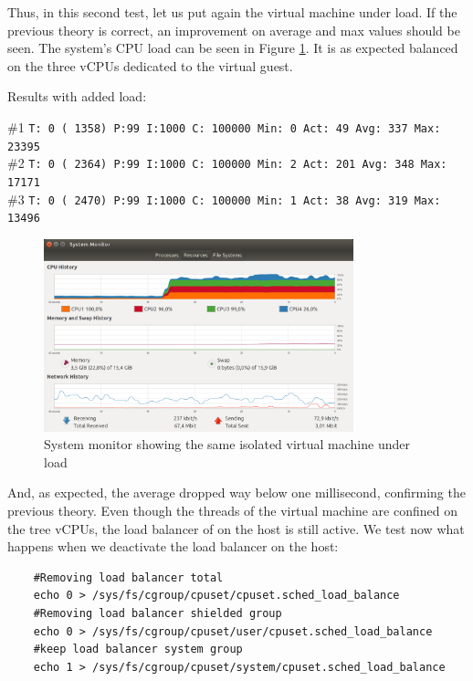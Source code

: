 \documentclass[]{scrartcl}
\begin{document}
Thus, in this second test, let us put again the virtual machine under load. If the previous theory is correct, an improvement on average and max values should be seen. The system's CPU load can be seen in Figure \ref{fig:test-cpuload}. It is as expected balanced on the three vCPUs dedicated to the virtual guest.

\noindent Results with added load: 

\noindent \small \#1 \texttt{T: 0 ( 1358) P:99 I:1000 C: 100000 Min: 0 Act:   49 Avg:  337 Max:   23395}\\
\noindent \small \#2 \texttt{T: 0 ( 2364) P:99 I:1000 C: 100000 Min: 2 Act:  201 Avg:  348 Max:   17171}\\
\noindent \small \#3 \texttt{T: 0 ( 2470) P:99 I:1000 C: 100000 Min: 1 Act:   38 Avg:  319 Max:   13496}


\begin{figure}[t]
	\centering
	\includegraphics[width=0.8\textwidth]{test-cpuload}
	\caption{System monitor showing the same isolated virtual machine under load}
	\label{fig:test-cpuload}
\end{figure}

And, as expected, the average dropped way below one millisecond, confirming the previous theory.
Even though the threads of the virtual machine are confined on the tree vCPUs, the load balancer of on the host is still active. We test now what happens when we deactivate the load balancer on the host:

\begin{verbatim}
	#Removing load balancer total
	echo 0 > /sys/fs/cgroup/cpuset/cpuset.sched_load_balance
	#Removing load balancer shielded group
	echo 0 > /sys/fs/cgroup/cpuset/user/cpuset.sched_load_balance
	#keep load balancer system group
	echo 1 > /sys/fs/cgroup/cpuset/system/cpuset.sched_load_balance
\end{verbatim}
\end{document}
